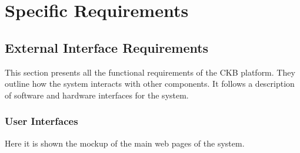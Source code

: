 \chapter{Specific Requirements}

\section{External Interface Requirements}
This section presents all the functional requirements of the CKB platform.
They outline how the system interacts with other components.
It follows a description of software and hardware interfaces for the system.

\subsection{User Interfaces}


Here it is shown the mockup of the main web pages of the system.

\captionsetup[figure]{skip=0pt}
